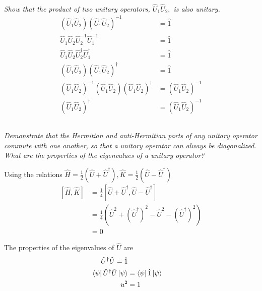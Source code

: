 \documentclass{article}
\begin{document}
\subsection{}
\textit{Show that the product of two unitary operators, $\hat{U}_{1} \hat{U}_{2},$ is also unitary.}
\begin{align*}
    \left(\hat{U}_1 \hat{U}_2\right) \left(\hat{U}_1 \hat{U}_2\right)^{-1} &= \hat 1 \\ 
    \hat{U}_1 \hat{U}_2 \hat{U}_{2}^{-1} \hat{U}_{1}^{-1} &= \hat 1 \\ 
    \hat{U}_1 \hat{U}_2 \hat{U}_{2}^{\dagger} \hat{U}_{1}^{\dagger} &= \hat 1 \\ 
    \left(\hat{U}_1 \hat{U}_2\right) \left(\hat{U}_1 \hat{U}_2\right)^{\dagger} &= \hat 1 \\
    \left(\hat{U}_1 \hat{U}_2\right)^{-1}\left(\hat{U}_1 \hat{U}_2\right) \left(\hat{U}_1 \hat{U}_2\right)^{\dagger} &= \left(\hat{U}_1 \hat{U}_2\right)^{-1} \\
    \left(\hat{U}_1 \hat{U}_2\right)^{\dagger} &= \left(\hat{U}_1 \hat{U}_2\right)^{-1} 
\end{align*}

\subsection{}
\textit{Demonstrate that the Hermitian and anti-Hermitian parts of any unitary operator commute with one another, so that a unitary operator can always be diagonalized. What are the properties of the eigenvalues of a unitary operator?}

Using the relations $\hat H = \frac{1}{2} (\hat{U} + \hat{U}^\dagger),\hat K = \frac{1}{2} (\hat{U}  - \hat{ U}^\dagger)$
\begin{align*}
    \left[\hat H, \hat K \right] &= \frac{1}{4}\left[\hat{U} + \hat{U}^\dagger, \hat{U} - \hat{U}^\dagger\right]\\
    & = \frac{1}{4}\left(\hat{U}^2 + (\hat{U}^\dagger)^2 -  \hat{U}^2 - (\hat{U}^\dagger)^2 \right)\\
    &=0
\end{align*}

The properties of the eigenvalues of $\hat U$ are
\begin{align*}
    \hat{U}^\dagger \hat{U} = \hat 1\\
    \bra{\psi}\hat{U}^\dagger \hat{U}\ket{\psi} &= \bra{\psi}\hat 1 \ket{\psi}\\
    u^2 &=1
\end{align*}
\end{document}
